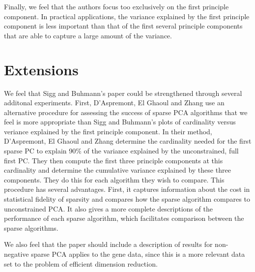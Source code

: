 \documentclass{article}
\begin{document}
Finally, we feel that the authors focus too exclusively on
the first principle component.
In practical applications, the variance explained by the first
principle component is less important than that of the first
several principle components that are able to capture a large
amount of the variance.

\section{Extensions}

We feel that Sigg and Buhmann's paper could be strengthened
through several additonal experiments. First,
D'Aspremont, El Ghaoul and Zhang
use an alternative procedure for assessing the success of
sparse PCA algorithms that we feel is more appropriate than
Sigg and Buhmann's plots of cardinality versus veriance explained
by the first principle component.
In their method,
D'Aspremont, El Ghaoul and Zhang
determine the cardinality needed for the
first sparse PC to explain 90\% of the variance explained
by the unconstrained, full first PC.
They then compute the first three principle components at this
cardinality and determine the cumulative variance explained by
these three components. They do this for each algorithm they
wish to compare. This procedure has several advantages.
First, it captures information about the cost in statistical
fidelity of sparsity and compares how the sparse algorithm
compares to unconstrained PCA. It also gives a more complete
descriptions of the performance of each sparse algorithm, which
facilitates comparison between the sparse algorithms.

We also feel that the paper should include a description of
results for non-negative sparse PCA applies to the gene data,
since this is a more relevant data set to the problem of
efficient dimension reduction.
\end{document}
